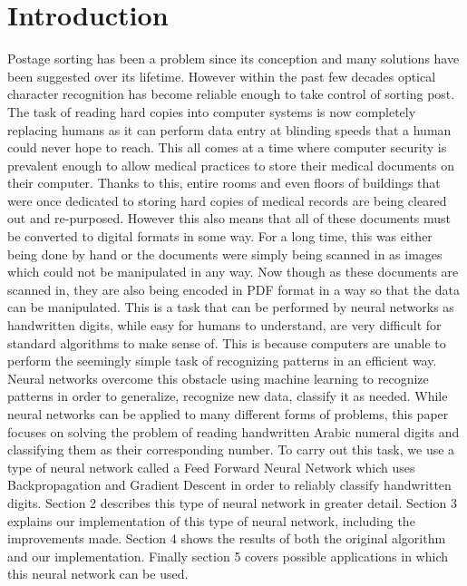 \documentclass[12pt]{article}
\theoremstyle{definition}
\theoremstyle{plain}
\begin{document}
\section{Introduction}
Postage sorting has been a problem since its conception and many solutions have been suggested over its lifetime. However within the past few decades optical character recognition has become reliable enough to take control of sorting post. The task of reading hard copies into computer systems is now completely replacing humans as it can perform data entry at blinding speeds that a human could never hope to reach. This all comes at a time where computer security is prevalent enough to allow medical practices to store their medical documents on their computer. Thanks to this, entire rooms and even floors of buildings that were once dedicated to storing hard copies of medical records are being cleared out and re-purposed. However this also means that all of these documents must be converted to digital formats in some way. For a long time, this was either being done by hand or the documents were simply being scanned in as images which could not be manipulated in any way. Now though as these documents are scanned in, they are also being encoded in PDF format in a way so that the data can be manipulated. This is a task that can be performed by neural networks as handwritten digits, while easy for humans to understand, are very difficult for standard algorithms to make sense of. This is because computers are unable to perform the seemingly simple task of recognizing patterns in an efficient way. Neural networks overcome this obstacle using machine learning to recognize patterns in order to generalize, recognize new data, classify it as needed. While neural networks can be applied to many different forms of problems, this paper focuses on solving the problem of reading handwritten Arabic numeral digits and classifying them as their corresponding number. To carry out this task, we use a type of neural network called a Feed Forward Neural Network which uses Backpropagation and Gradient Descent in order to reliably classify handwritten digits. Section 2 describes this type of neural network in greater detail. Section 3 explains our implementation of this type of neural network, including the improvements made. Section 4 shows the results of both the original algorithm and our implementation. Finally section 5 covers possible applications in which this neural network can be used.
\end{document}
